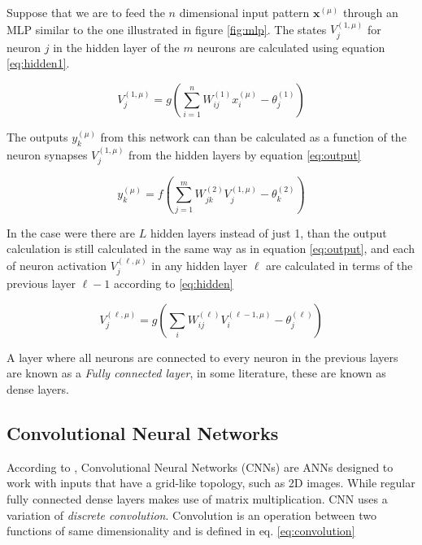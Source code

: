 Suppose that we are to feed the $n$ dimensional input pattern $\boldsymbol{x}^{(\mu)}$ through an MLP similar to the one illustrated in figure \ref{fig:mlp}. The states $V_j^{(1,\mu)}$ for neuron $j$ in the hidden layer of the $m$ neurons are calculated using equation \eqref{eq:hidden1}.

\begin{equation}
    \label{eq:hidden1}
    V^{(1,\mu)}_j = g\left(\sum_{i=1}^nW^{(1)}_{ij} x^{(\mu)}_i - \theta^{(1)}_j\right)
\end{equation}

The outputs $y_k^{(\mu)}$ from this network can than be calculated as a function of the neuron synapses $V^{(1,\mu)}_j$ from the hidden layers by equation \eqref{eq:output}

\begin{equation}
    \label{eq:output}
    y_k^{(\mu)} = f\left(\sum_{j = 1}^m W_{jk}^{(2)}V_j^{(1,\mu)} - \theta^{(2)}_k\right)
\end{equation}

In the case were there are $L$ hidden layers instead of just 1, than the output calculation is still calculated in the same way as in equation \eqref{eq:output}, and each of neuron activation $V^{(\ell,\mu)}_j$ in any hidden layer $\ell$ are calculated in terms of the previous layer $\ell-1$ according to \eqref{eq:hidden}

\begin{equation}
    \label{eq:hidden}
    V_j^{(\ell,\mu)} = g\left(\sum_{i}W^{(\ell)}_{ij} V^{(\ell-1,\mu)}_i-\theta^{(\ell)}_j\right) 
\end{equation}

A layer where all neurons are connected to every neuron in the previous layers are known as a \textit{Fully connected layer}\cite{Goodfellow-et-al-2016}, in some literature, these are known as dense layers\cite{chollet2018deep}.

\subsection{Convolutional Neural Networks}

According to \cite{Goodfellow-et-al-2016}, Convolutional Neural Networks (CNNs) are ANNs designed to work with inputs that have a grid-like topology, such as 2D images. While regular fully connected dense layers makes use of matrix multiplication. CNN uses a variation of \textit{discrete convolution}\cite{Goodfellow-et-al-2016}. Convolution is an operation between two functions of same dimensionality and is defined in eq. \eqref{eq:convolution}

